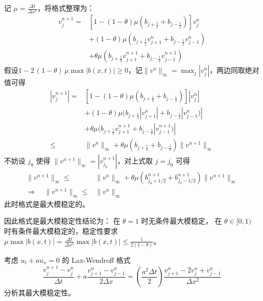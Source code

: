 \begin{solution*}
    记 $\mu = \frac{\Delta t}{\Delta x^2}$，将格式整理为：
    \begin{align*}
        [1+\theta \mu (b_{j+\frac12} + b_{j-\frac12})] v^{n+1}_j
        ={} & [1- (1-\theta) \mu (b_{j+\frac12}+b_{j-\frac12})] v^{n}_j                \\
            & + (1-\theta) \mu (b_{j+\frac12} v^n_{j+1} + b_{j-\frac12} v^n_{j-1})     \\
            & + \theta \mu (b_{j+\frac12} v^{n+1}_{j+1} + b_{j-\frac12} v^{n+1}_{j-1})
    \end{align*}
    假设$1-2\,(1-\theta)\,\mu \max|b(x,t)|\ge0$，记$\|v^n\|_\infty = \max_j|v_j^n|$，两边同取绝对值可得
    \begin{align*}
        [1+\theta \mu (b_{j+\frac12} + b_{j-\frac12})] |v^{n+1}_j|
        ={}   & [1- (1-\theta) \mu (b_{j+\frac12}+b_{j-\frac12})] |v^{n}_j|                \\
              & + (1-\theta) \mu (b_{j+\frac12} |v^n_{j+1}| + b_{j-\frac12} |v^n_{j-1})|   \\
              & + \theta \mu (b_{j+\frac12} v^{n+1}_{j+1} + b_{j-\frac12} |v^{n+1}_{j-1})| \\
        \le{} & \|v^n\|_\infty
        + \theta \mu (b_{j+\frac12}  + b_{j-\frac12}) \|v^{n+1}\|_\infty
    \end{align*}
    不妨设 $j_0$ 使得 $\|v^{n+1}\|_\infty = |v_{j_0}^{n+1}|$，对上式取 $j = j_0$ 可得
    \begin{align*}
        [1 + \theta \mu (b^{n+1}_{j_0+1/2}+b^{n+1}_{j_0-1/2})]\|v^{n+1}\|_\infty
        \le{}                                        & \|v^{n}\|_\infty + \theta \mu (b^{n+1}_{j_0+1/2}+b^{n+1}_{j_0-1/2})\|v^{n+1}\|_\infty \\
        \Rightarrow \quad   \|v^{n+1}\|_\infty \le{} & \|v^{n}\|_\infty
    \end{align*}
    此时格式是最大模稳定的。

    因此格式是最大模稳定性结论为：
    在 $\theta=1$ 时无条件最大模稳定，
    在 $\theta \in [0,1)$ 时有条件最大模稳定的，稳定性要求 $\mu \max|b(x,t)| = \frac{\Delta t}{\Delta x^2} \max|b(x,t)| \le \frac{1}{2(1-\theta)}$。
\end{solution*}


\begin{example}
    考虑 $u_t + a u_{x} = 0$ 的 Lax-Wendroff 格式
    \[
        \frac{v_j^{n+1}-v_j^n}{\Delta t} + a \frac{v_{j+1}^n-v_{j-1}^n}{2\Delta x} = \left(\frac{a^2 \Delta t}{2}\right) \frac{v_{j+1}^n-2 v_j^n+v_{j-1}^n}{\Delta x^2}
    \]
    分析其最大模稳定性。
\end{example}


